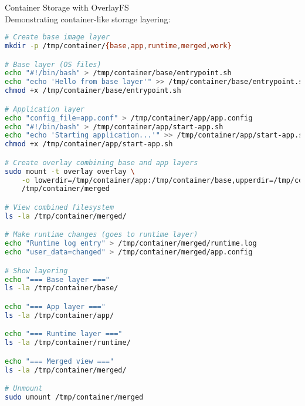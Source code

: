 \begin{example2}{Container Storage with OverlayFS}\\
    Demonstrating container-like storage layering:
    
\begin{lstlisting}[language=bash, style=basesmol]
# Create base image layer
mkdir -p /tmp/container/{base,app,runtime,merged,work}

# Base layer (OS files)
echo "#!/bin/bash" > /tmp/container/base/entrypoint.sh
echo "echo 'Hello from base layer'" >> /tmp/container/base/entrypoint.sh
chmod +x /tmp/container/base/entrypoint.sh

# Application layer
echo "config_file=app.conf" > /tmp/container/app/app.config
echo "#!/bin/bash" > /tmp/container/app/start-app.sh
echo "echo 'Starting application...'" >> /tmp/container/app/start-app.sh
chmod +x /tmp/container/app/start-app.sh

# Create overlay combining base and app layers
sudo mount -t overlay overlay \
    -o lowerdir=/tmp/container/app:/tmp/container/base,upperdir=/tmp/container/runtime,workdir=/tmp/container/work \
    /tmp/container/merged

# View combined filesystem
ls -la /tmp/container/merged/

# Make runtime changes (goes to runtime layer)
echo "Runtime log entry" > /tmp/container/merged/runtime.log
echo "user_data=changed" > /tmp/container/merged/app.config

# Show layering
echo "=== Base layer ==="
ls -la /tmp/container/base/

echo "=== App layer ==="
ls -la /tmp/container/app/

echo "=== Runtime layer ==="
ls -la /tmp/container/runtime/

echo "=== Merged view ==="
ls -la /tmp/container/merged/

# Unmount
sudo umount /tmp/container/merged
\end{lstlisting}
\end{example2}